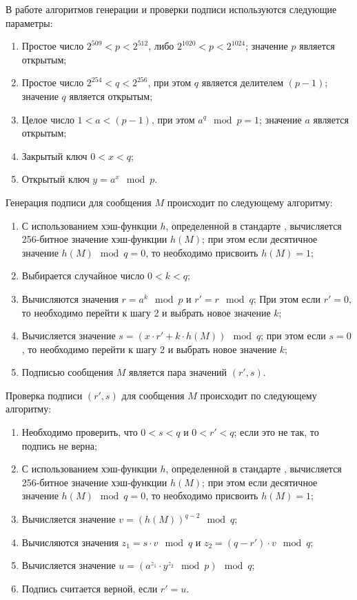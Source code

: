 \documentclass{./civarticle}
\begin{document}
В работе алгоритмов генерации и проверки подписи используются следующие параметры:

\begin{enumerate}
    \item Простое число $2^{509} < p < 2^{512}$, либо $2^{1020} < p < 2^{1024}$; значение $p$ является открытым;
    \item Простое число $2^{254} < q < 2^{256}$, при этом $q$ является делителем $(p - 1)$; значение $q$ является открытым;
    \item Целое число $1 < a < (p - 1)$, при этом $a^{q} \mod p = 1$; значение $a$ является открытым;
    \item Закрытый ключ $0 < x < q$;
    \item Открытый ключ $y = a^x \mod p$.
\end{enumerate}

Генерация подписи для сообщения $M$ происходит по следующему алгоритму:
\begin{enumerate}
    \item С использованием хэш-функции $h$, определенной в стандарте \cite{gost11-94}, вычисляется 256-битное значение хэш-функции $h(M)$; при этом если десятичное значение $h(M) \mod q = 0$, то необходимо присвоить $h(M) = 1$;
    \item Выбирается случайное число $0 < k < q$;
    \item Вычисляются значения $r = a^k \mod p$ и $r' = r \mod q$; При этом если $r' = 0$, то необходимо перейти к шагу 2 и выбрать новое значение $k$;
    \item Вычисляется значение $s = (x\cdot r' + k\cdot h(M)) \mod q$; при этом если $s = 0$, то необходимо перейти к шагу 2 и выбрать новое значение $k$;
    \item Подписью сообщения $M$ является пара значений $(r', s)$.
\end{enumerate}

Проверка подписи $(r', s)$ для сообщения $M$ происходит по следующему алгоритму:

\begin{enumerate}
    \item Необходимо проверить, что $0 < s < q$ и $0 < r' < q$; если это не так, то подпись не верна;
    \item С использованием хэш-функции $h$, определенной в стандарте \cite{gost11-94}, вычисляется 256-битное значение хэш-функции $h(M)$; при этом если десятичное значение $h(M) \mod q = 0$, то необходимо присвоить $h(M) = 1$;
    \item Вычисляется значение $v = (h(M))^{q-2} \mod q$;
    \item Вычисляются значения $z_1 = s\cdot v \mod q$ и $z_2 = (q - r')\cdot v \mod q$;
    \item Вычисляется значение $u = (a^{z_1}\cdot y^{z_2} \mod p) \mod q$;
    \item Подпись считается верной, если $r' = u$.
\end{enumerate}
\end{document}
